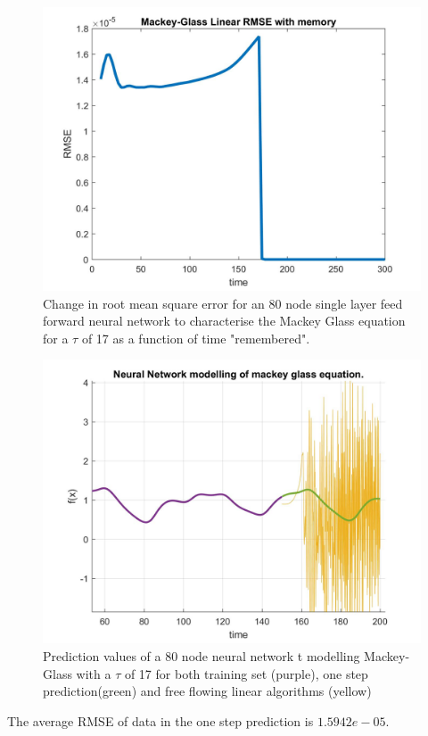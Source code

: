 \documentclass[a4paper,10pt, twocolumn]{article}
\begin{document}
\begin{figure}[ht]
	\includegraphics[width=0.9\linewidth]{linMemory.jpg}
	\centering
	\caption{ Change in root mean square error for an 80 node single layer feed forward neural network to characterise the Mackey Glass equation for a $\tau$ of 17 as a function of time "remembered".  }
		\label{fig:linMemory}
\end{figure}
\begin{figure}[ht]

	\includegraphics[width=0.9\linewidth]{nnMackeyGlass.jpg}
	\centering
	\caption{ Prediction values of a 80 node neural network t modelling Mackey-Glass with a $\tau$ of 17 for both training set (purple), one step prediction(green) and free flowing linear algorithms (yellow)  }
		\label{fig:nnMackeyGlass}
\end{figure}

The average RMSE of data in the one step prediction is $1.5942e-05$. 
\end{document}
